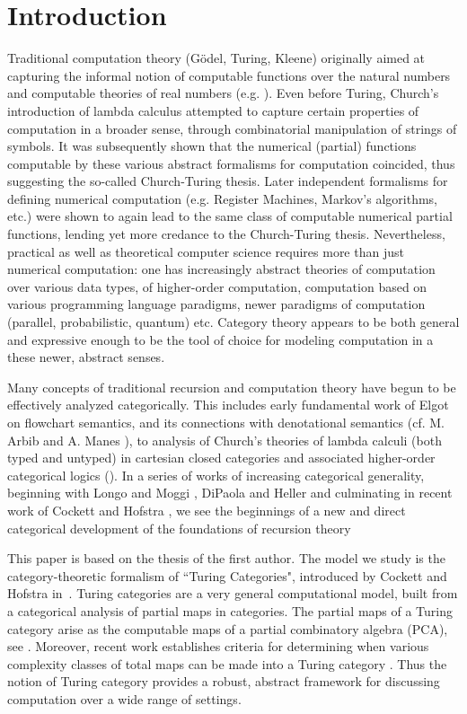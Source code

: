 \documentclass{entcs} \usepackage{entcsmacro}
\begin{document}
\section{Introduction}\label{intro}

Traditional computation theory (G\"odel, Turing, Kleene) originally aimed at capturing the 
informal notion of computable functions over the natural numbers and computable theories of real numbers
(e.g. \cite{Turing-Paper,IMM}).  Even before Turing, Church's introduction of lambda calculus \cite{Church}  attempted to capture certain properties of computation in a broader sense,
through combinatorial manipulation of strings of symbols. It was subsequently shown that the
numerical (partial) functions computable by these various abstract formalisms for computation coincided, thus suggesting the so-called Church-Turing thesis.  Later independent formalisms
for defining numerical computation (e.g. Register Machines, Markov's algorithms, etc.) were shown to again lead to the same class of computable numerical partial functions, lending yet more credance to the Church-Turing thesis.  Nevertheless, practical as well as theoretical computer science requires more than just numerical computation:  one has increasingly abstract theories of computation over various data types, of higher-order computation, computation based on various programming language paradigms, newer paradigms of computation (parallel, probabilistic, quantum) etc.  Category theory appears to be both general and expressive enough to be 
the tool of choice for modeling computation in a these newer, abstract senses. 

Many concepts of traditional recursion and computation theory have begun to be effectively analyzed categorically.  This includes early fundamental work of Elgot on flowchart semantics,
and its connections with denotational semantics  (cf.  M. Arbib and A. Manes \cite{MA}), to 
analysis of Church's theories of lambda calculi (both typed and untyped) in cartesian closed categories and associated higher-order categorical logics (\cite{HOCL}).  In a series of works
of increasing categorical generality, beginning with Longo and Moggi \cite{LMog}, DiPaola and Heller \cite{DiPao} and culminating in recent work of Cockett and Hofstra \cite{Turing}, we see the beginnings of a new and direct categorical development of the foundations of recursion theory 


This paper is based on the thesis of the first author.
The model we study is the category-theoretic formalism of ``Turing Categories", introduced by Cockett and Hofstra in~\cite{Turing}. Turing categories are a very general computational model, built from a categorical analysis of 
partial maps in categories. The partial maps of a Turing category arise as the computable maps of a partial combinatory algebra (PCA), see \cite{Turing}.  Moreover,  recent work establishes criteria for 
determining when various complexity classes of total maps  can be made into a Turing category
\cite{Total}.  Thus the notion of Turing category provides a robust, abstract framework for discussing computation over a wide range of settings. 
\end{document}
